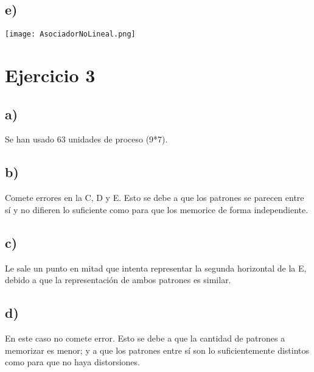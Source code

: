 \documentclass[12pt]{article}
\begin{document}
\subsection*{e)}
\texttt{[image: AsociadorNoLineal.png]} 

\section*{Ejercicio 3}

\subsection*{a)}
Se han usado 63 unidades de proceso (9*7).
\subsection*{b)}
Comete errores en la C, D y E. Esto se debe a que los patrones se parecen entre sí y no difieren lo suficiente como para que los memorice de forma independiente.
\subsection*{c)}
Le sale un punto en mitad que intenta representar la segunda horizontal de la E, debido a que la representación de ambos patrones es similar.

\subsection*{d)}
En este caso no comete error. Esto se debe a que la cantidad de patrones a memorizar es menor; y a que los patrones entre sí son lo suficientemente distintos como para que no haya distorsiones.
\end{document}

